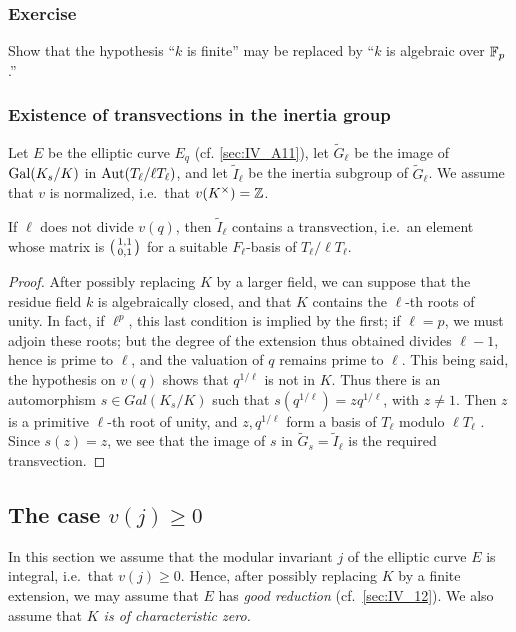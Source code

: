 \begin{subappendices}
\subsubsection*{Exercise}
Show that the hypothesis ``$k$ is finite'' may be replaced by ``$k$ is algebraic
over $\mathbb{F}_p$.''

\subsubsection{Existence of transvections in the inertia group}
\label{sec:IV_A15}


Let $E$ be the elliptic curve $E_q$ (cf. \ref{sec:IV_A11}), let
$\tilde{G}_\ell$ be the image of $\operatorname{Gal}({K}_s/K)$ in $\operatorname{Aut}(T_\ell / \ell
T_\ell)$, and let $\tilde{I}_\ell$ be the inertia subgroup of $\tilde{G}_\ell$.
We assume that $v$ is normalized, i.e.\ that $v(K^\times) = \mathbb{Z}$.
\dpage
\begin{prop}
If $\ell$ does not divide $v(q)$, then $\tilde{I}_\ell$ contains a transvection,
i.e.\ an element whose matrix is
$\begin{psmallmatrix} 1, 1 \\ 0, 1 \end{psmallmatrix}$
for a suitable $F_\ell$-basis of $T_\ell / \ell T_\ell$.
\end{prop}

\begin{proof}
After possibly replacing $K$ by a larger field, we can suppose
that the residue field $k$ is algebraically closed, and that $K$ contains
the $\ell$-th roots of unity. In fact, if $\ell ^ p$, this last condition is
implied by the first; if $\ell = p$, we must adjoin these roots; but the degree
of the extension thus obtained divides $\ell-1$, hence is prime to
$\ell$, and the valuation of $q$ remains prime to $\ell$. This being said, the
hypothesis on $v(q)$ shows that $q^{1/\ell}$ is not in $K$. Thus there is an
automorphism $s \in Gal(K_s/K)$ such that $s(q^{1/\ell}) = zq^{1/\ell}$, with $z
\neq 1$. Then $z$ is a
primitive $\ell$-th root of unity, and $z,q^{1/\ell}$ form
a basis of $T_\ell$ modulo $\ell T_\ell$ . Since $s(z) = z$, we see that the
image
of $s$ in $\tilde{G}_s = \tilde{I}_\ell$ is the required transvection.
\end{proof}

\subsection{The case \texorpdfstring{$v(j) \ge 0$}{v(j) ≥ 0}}
\label{sec:IV_A2}
In this section we assume that the modular invariant $j$ of the elliptic curve
$E$ is integral, i.e.\ that $v(j) \ge 0$. Hence, after possibly replacing $K$
by a finite extension, we may assume that $E$ has \emph{good reduction} (cf.\
\ref{sec:IV_12}). We also assume that \emph{$K$ is of characteristic zero.}


\end{subappendices}
